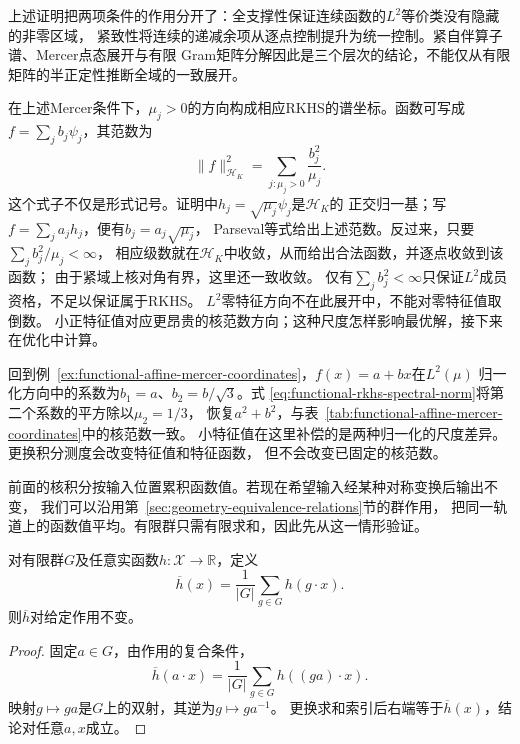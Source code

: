上述证明把两项条件的作用分开了：全支撑性保证连续函数的$L^2$等价类没有隐藏的非零区域，
紧致性将连续的递减余项从逐点控制提升为统一控制。紧自伴算子谱、Mercer点态展开与有限
Gram矩阵分解因此是三个层次的结论，不能仅从有限矩阵的半正定性推断全域的一致展开。

在上述Mercer条件下，$\mu_j>0$的方向构成相应RKHS的谱坐标。函数可写成
$f=\sum_jb_j\psi_j$，其范数为
\begin{equation}
  \lVert f\rVert_{\mathcal{H}_K}^2
  =
  \sum_{j:\mu_j>0}\frac{b_j^2}{\mu_j}.
  \label{eq:functional-rkhs-spectral-norm}
\end{equation}
这个式子不仅是形式记号。证明中$h_j=\sqrt{\mu_j}\psi_j$是$\mathcal H_K$的
正交归一基；写$f=\sum_j a_jh_j$，便有$b_j=a_j\sqrt{\mu_j}$，
Parseval等式给出上述范数。反过来，只要$\sum_j b_j^2/\mu_j<\infty$，
相应级数就在$\mathcal H_K$中收敛，从而给出合法函数，并逐点收敛到该函数；
由于紧域上核对角有界，这里还一致收敛。
仅有$\sum_j b_j^2<\infty$只保证$L^2$成员资格，不足以保证属于RKHS。
$L^2$零特征方向不在此展开中，不能对零特征值取倒数。
小正特征值对应更昂贵的核范数方向；这种尺度怎样影响最优解，接下来在优化中计算。

回到例~\ref{ex:functional-affine-mercer-coordinates}，$f(x)=a+bx$在$L^2(\mu)$
归一化方向中的系数为$b_1=a$、$b_2=b/\sqrt3$。式
\eqref{eq:functional-rkhs-spectral-norm}将第二个系数的平方除以$\mu_2=1/3$，
恢复$a^2+b^2$，与表~\ref{tab:functional-affine-mercer-coordinates}中的核范数一致。
小特征值在这里补偿的是两种归一化的尺度差异。更换积分测度会改变特征值和特征函数，
但不会改变已固定的核范数。


前面的核积分按输入位置累积函数值。若现在希望输入经某种对称变换后输出不变，
我们可以沿用第~\ref{sec:geometry-equivalence-relations}节的群作用，
把同一轨道上的函数值平均。有限群只需有限求和，因此先从这一情形验证。
\begin{theorem}[有限群平均的不变性]
\label{thm:geometry-finite-group-average}
对有限群$G$及任意实函数$h:\mathcal X\to\mathbb R$，定义
\begin{equation}
 \overline h(x)=\frac1{|G|}\sum_{g\in G}h(g\cdot x).
 \label{eq:geometry-finite-group-averaging}
\end{equation}
则$\overline h$对给定作用不变。
\end{theorem}
\begin{proof}
固定$a\in G$，由作用的复合条件，
\[
 \overline h(a\cdot x)=\frac1{|G|}\sum_{g\in G}h((ga)\cdot x).
\]
映射$g\mapsto ga$是$G$上的双射，其逆为$g\mapsto ga^{-1}$。
更换求和索引后右端等于$\overline h(x)$，结论对任意$a,x$成立。
\end{proof}

